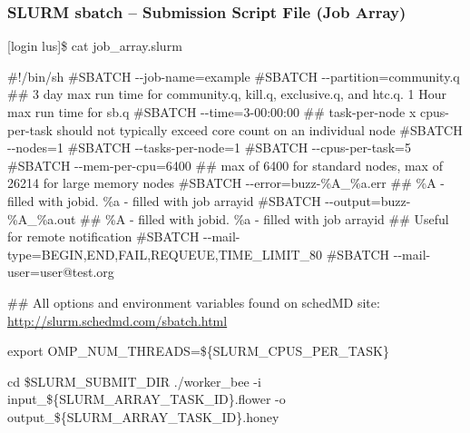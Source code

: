 \documentclass[t,hyperref={pdfpagelabels=false}]{beamer}
\newcommand{\ddash}{-{}-}
\begin{document}
\begin{frame}[fragile]
\frametitle{SLURM sbatch -- Submission Script File (Job Array)}
\begin{semiverbatim}\tiny
[login lus]\$ cat job_array.slurm

\#!/bin/sh
\#SBATCH \ddash{}job-name=example
\#SBATCH \ddash{}partition=community.q
\#\# 3 day max run time for community.q, kill.q, exclusive.q, and htc.q.  1 Hour max run time for sb.q
\#SBATCH \ddash{}time=3-00:00:00 
\#\# task-per-node x cpus-per-task should not typically exceed core count on an individual node 
\#SBATCH \ddash{}nodes=1
\#SBATCH \ddash{}tasks-per-node=1
\#SBATCH \ddash{}cpus-per-task=5
\#SBATCH \ddash{}mem-per-cpu=6400 \#\# max of 6400 for standard nodes, max of 26214 for large memory nodes                                                                                                                                               
\#SBATCH \ddash{}error=buzz-\%A\_\%a.err \#\# \%A - filled with jobid. \%a - filled with job arrayid
\#SBATCH \ddash{}output=buzz-\%A\_\%a.out \#\# \%A - filled with jobid. \%a - filled with job arrayid
\#\# Useful for remote notification
\#SBATCH \ddash{}mail-type=BEGIN,END,FAIL,REQUEUE,TIME\_LIMIT\_80
\#SBATCH \ddash{}mail-user=user@test.org

\#\# All options and environment variables found on schedMD site: \href{http://slurm.schedmd.com/sbatch.html}{http://slurm.schedmd.com/sbatch.html}

export OMP\_NUM\_THREADS=\$\{SLURM\_CPUS\_PER\_TASK\}

cd \$SLURM\_SUBMIT\_DIR
./worker\_bee -i input\_\$\{SLURM_ARRAY_TASK_ID\}.flower -o output\_\$\{SLURM_ARRAY_TASK_ID\}.honey
\end{semiverbatim}
\end{frame}
\end{document}
